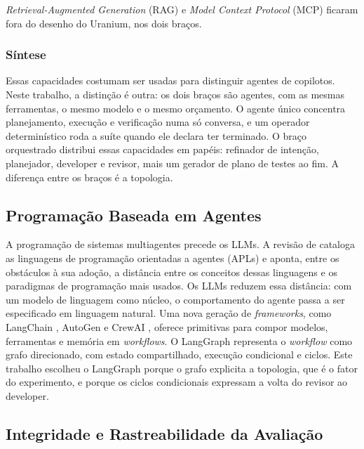 \textit{Retrieval-Augmented Generation} (RAG) e \textit{Model Context Protocol} (MCP) ficaram fora do desenho do Uranium, nos dois braços.

\subsubsection{Síntese}

Essas capacidades costumam ser usadas para distinguir agentes de copilotos. Neste trabalho, a distinção é outra: os dois braços são agentes, com as mesmas ferramentas, o mesmo modelo e o mesmo orçamento. O agente único concentra planejamento, execução e verificação numa só conversa, e um operador determinístico roda a suíte quando ele declara ter terminado. O braço orquestrado distribui essas capacidades em papéis: refinador de intenção, planejador, developer e revisor, mais um gerador de plano de testes ao fim. A diferença entre os braços é a topologia.

\subsection{Programação Baseada em Agentes}
\label{ssec:programacao}

A programação de sistemas multiagentes precede os LLMs. A revisão de \cite{ReviewMAS2021} cataloga as linguagens de programação orientadas a agentes (APLs) e aponta, entre os obstáculos à sua adoção, a distância entre os conceitos dessas linguagens e os paradigmas de programação mais usados. Os LLMs reduzem essa distância: com um modelo de linguagem como núcleo, o comportamento do agente passa a ser especificado em linguagem natural. Uma nova geração de \textit{frameworks}, como LangChain \citep{Chase2022LangChain}, AutoGen \citep{Wu2024AutoGen} e CrewAI \citep{Moura2023CrewAI}, oferece primitivas para compor modelos, ferramentas e memória em \textit{workflows}. O LangGraph \citep{LangGraph2025} representa o \textit{workflow} como grafo direcionado, com estado compartilhado, execução condicional e ciclos. Este trabalho escolheu o LangGraph porque o grafo explicita a topologia, que é o fator do experimento, e porque os ciclos condicionais expressam a volta do revisor ao developer.

\subsection{Integridade e Rastreabilidade da Avaliação}
\label{ssec:integridade}

